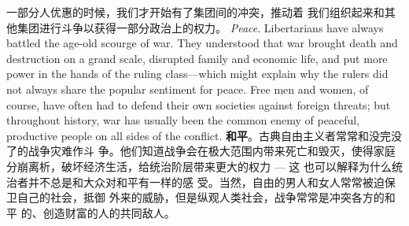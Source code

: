\begin{paracol}{2}
一部分人优惠的时候，我们才开始有了集团间的冲突，推动着
我们组织起来和其他集团进行斗争以获得一部分政治上的权力。
\switchcolumn*
\textit{Peace}. Libertarians have always battled the age-old scourge of
war. They understood that war brought death and destruction
on a grand scale, disrupted family and economic life, and put
more power in the hands of the ruling class---which might explain why the rulers did not always share the popular sentiment
for peace. Free men and women, of course, have often had to
defend their own societies against foreign threats; but throughout history, war has usually been the common enemy of peaceful, productive people on all sides of the conflict.
\switchcolumn
\textbf{和平}。古典自由主义者常常和没完没了的战争灾难作斗
争。他们知道战争会在极大范围内带来死亡和毁灭，使得家庭
分崩离析，破坏经济生活，给统治阶层带来更大的权力 --- 这
也可以解释为什么统治者并不总是和大众对和平有一样的感
受。当然，自由的男人和女人常常被迫保卫自己的社会，抵御
外来的威胁，但是纵观人类社会，战争常常是冲突各方的和平
的、创造财富的人的共同敌人。


\end{paracol}
